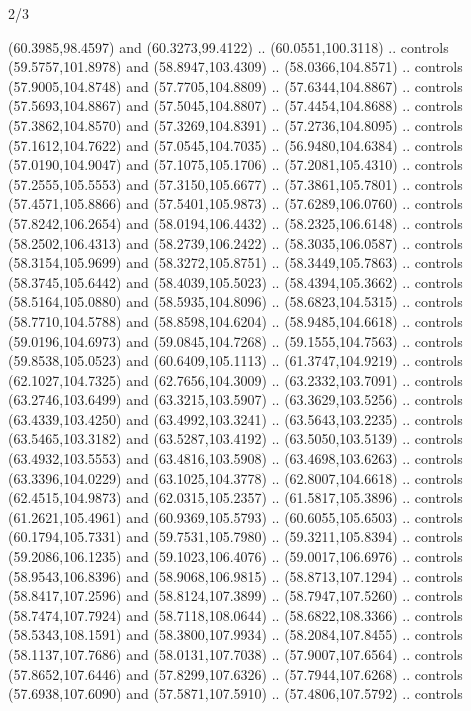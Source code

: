 \begin{flagdescription}{2/3}
\begin{scope}[shift={(0.5\flaglength,0.5)},scale=\flagwidth/320]
\begin{scope}[y=0.8pt, x=0.8pt, yscale=-1,shift={(-118.3,-146)}]
  (60.3985,98.4597) and (60.3273,99.4122) .. (60.0551,100.3118) .. controls
  (59.5757,101.8978) and (58.8947,103.4309) .. (58.0366,104.8571) .. controls
  (57.9005,104.8748) and (57.7705,104.8809) .. (57.6344,104.8867) .. controls
  (57.5693,104.8867) and (57.5045,104.8807) .. (57.4454,104.8688) .. controls
  (57.3862,104.8570) and (57.3269,104.8391) .. (57.2736,104.8095) .. controls
  (57.1612,104.7622) and (57.0545,104.7035) .. (56.9480,104.6384) .. controls
  (57.0190,104.9047) and (57.1075,105.1706) .. (57.2081,105.4310) .. controls
  (57.2555,105.5553) and (57.3150,105.6677) .. (57.3861,105.7801) .. controls
  (57.4571,105.8866) and (57.5401,105.9873) .. (57.6289,106.0760) .. controls
  (57.8242,106.2654) and (58.0194,106.4432) .. (58.2325,106.6148) .. controls
  (58.2502,106.4313) and (58.2739,106.2422) .. (58.3035,106.0587) .. controls
  (58.3154,105.9699) and (58.3272,105.8751) .. (58.3449,105.7863) .. controls
  (58.3745,105.6442) and (58.4039,105.5023) .. (58.4394,105.3662) .. controls
  (58.5164,105.0880) and (58.5935,104.8096) .. (58.6823,104.5315) .. controls
  (58.7710,104.5788) and (58.8598,104.6204) .. (58.9485,104.6618) .. controls
  (59.0196,104.6973) and (59.0845,104.7268) .. (59.1555,104.7563) .. controls
  (59.8538,105.0523) and (60.6409,105.1113) .. (61.3747,104.9219) .. controls
  (62.1027,104.7325) and (62.7656,104.3009) .. (63.2332,103.7091) .. controls
  (63.2746,103.6499) and (63.3215,103.5907) .. (63.3629,103.5256) .. controls
  (63.4339,103.4250) and (63.4992,103.3241) .. (63.5643,103.2235) .. controls
  (63.5465,103.3182) and (63.5287,103.4192) .. (63.5050,103.5139) .. controls
  (63.4932,103.5553) and (63.4816,103.5908) .. (63.4698,103.6263) .. controls
  (63.3396,104.0229) and (63.1025,104.3778) .. (62.8007,104.6618) .. controls
  (62.4515,104.9873) and (62.0315,105.2357) .. (61.5817,105.3896) .. controls
  (61.2621,105.4961) and (60.9369,105.5793) .. (60.6055,105.6503) .. controls
  (60.1794,105.7331) and (59.7531,105.7980) .. (59.3211,105.8394) .. controls
  (59.2086,106.1235) and (59.1023,106.4076) .. (59.0017,106.6976) .. controls
  (58.9543,106.8396) and (58.9068,106.9815) .. (58.8713,107.1294) .. controls
  (58.8417,107.2596) and (58.8124,107.3899) .. (58.7947,107.5260) .. controls
  (58.7474,107.7924) and (58.7118,108.0644) .. (58.6822,108.3366) .. controls
  (58.5343,108.1591) and (58.3800,107.9934) .. (58.2084,107.8455) .. controls
  (58.1137,107.7686) and (58.0131,107.7038) .. (57.9007,107.6564) .. controls
  (57.8652,107.6446) and (57.8299,107.6326) .. (57.7944,107.6268) .. controls
  (57.6938,107.6090) and (57.5871,107.5910) .. (57.4806,107.5792) .. controls

\end{scope}
\end{scope}
\end{flagdescription}
